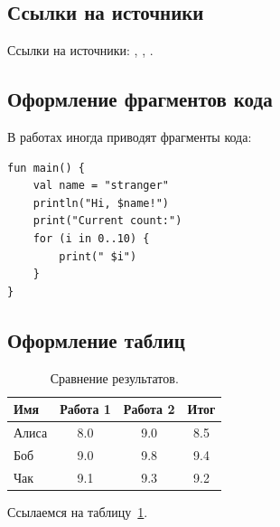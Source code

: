 \subsection{Ссылки на источники}

Ссылки на источники: \cite{voc}, \cite{vo2}, \cite{ij-sdk}.

\subsection{Оформление фрагментов кода}

В работах иногда приводят фрагменты кода:

\begin{verbatim}
fun main() {
    val name = "stranger"
    println("Hi, $name!")
    print("Current count:")
    for (i in 0..10) {
        print(" $i")
    }
}
\end{verbatim}


\subsection{Оформление таблиц}


\begin{table}[ht]
\begin{center}
\begin{tabular}{lccc}
    Имя & Работа 1 & Работа 2 & Итог \\
\hline
    Алиса & 8.0 & 9.0 & 8.5 \\
    Боб & 9.0 & 9.8 & 9.4 \\
    Чак & 9.1 & 9.3 & 9.2 \\
\end{tabular}
\caption{
\label{table-smth}
     Сравнение результатов.}
\end {center}
\end {table}

Ссылаемся на таблицу~\ref{table-smth}.


